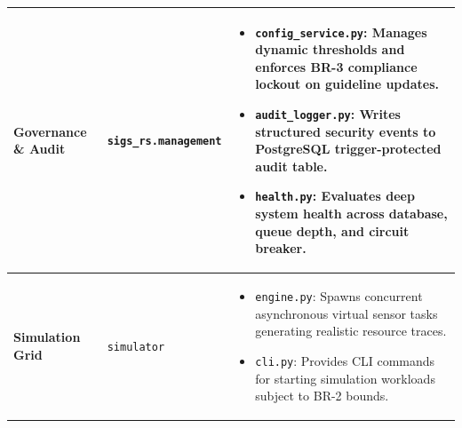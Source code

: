 \begin{table}[H]
\begin{tabularx}{\linewidth}{@{}p{3.2cm} p{3.5cm} X@{}}
\midrule
\textbf{Governance \& Audit} & \texttt{sigs\_rs.management} & 
\begin{itemize}[leftmargin=*,noitemsep,topsep=0pt]
    \item \texttt{config\_service.py}: Manages dynamic thresholds and enforces BR-3 compliance lockout on guideline updates.
    \item \texttt{audit\_logger.py}: Writes structured security events to PostgreSQL trigger-protected audit table.
    \item \texttt{health.py}: Evaluates deep system health across database, queue depth, and circuit breaker.
\end{itemize} \\
\midrule
\textbf{Simulation Grid} & \texttt{simulator} & 
\begin{itemize}[leftmargin=*,noitemsep,topsep=0pt]
    \item \texttt{engine.py}: Spawns concurrent asynchronous virtual sensor tasks generating realistic resource traces.
    \item \texttt{cli.py}: Provides CLI commands for starting simulation workloads subject to BR-2 bounds.
\end{itemize} \\
\bottomrule
\end{tabularx}
\end{table}
